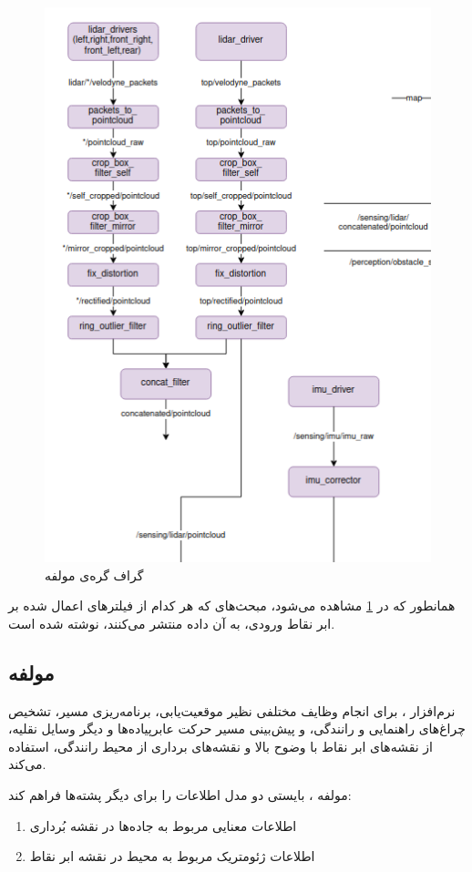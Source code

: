\begin{figure}[h!]
    \centering
    \includegraphics[width=0.75\linewidth]{figures/Sensing_Node_Graph.png}
    \caption{گراف گره‌ی مولفه ‌ \cite{Autoware:Documentation}}
    \label{fig:Sensing_Node_Graph}
\end{figure}
همانطور که در \cref{fig:Sensing_Node_Graph} مشاهده می‌شود، مبحث‌های  که هر کدام از فیلتر‌های اعمال شده بر ابر‌ نقاط ورودی، به آن داده‌ منتشر ‌می‌کنند، نوشته ‌شده است.

\subsection{مولفه }
نرم‌افزار ، برای انجام وظایف مختلفی نظیر موقعیت‌یابی، برنامه‌ریزی مسیر، تشخیص چراغ‌های راهنمایی و رانندگی، و پیش‌بینی مسیر حرکت عابر‌پیاده‌ها و دیگر وسایل نقلیه، از نقشه‌های ابر نقاط با وضوح بالا و نقشه‌های برداری از محیط رانندگی، استفاده می‌کند.

مولفه ، بایستی دو مدل اطلاعات را برای دیگر پشته‌ها فراهم کند:
\begin{enumerate}
    \item اطلاعات معنایی مربوط به جاده‌ها در نقشه بُرداری
    \item اطلاعات ژئومتریک مربوط به محیط در نقشه ابر نقاط
\end{enumerate}

